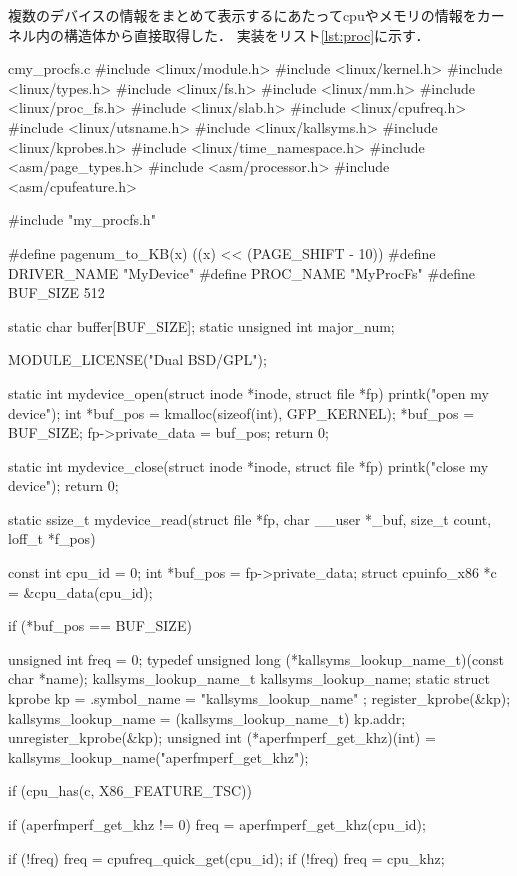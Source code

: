複数のデバイスの情報をまとめて表示するにあたってcpuやメモリの情報をカーネル内の構造体から直接取得した．
実装をリスト\ref{lst:proc}に示す．
\begin{longlisting}
\begin{myminted}{c}{my\_procfs.c}
#include <linux/module.h>
#include <linux/kernel.h>
#include <linux/types.h>
#include <linux/fs.h>
#include <linux/mm.h>
#include <linux/proc_fs.h>
#include <linux/slab.h>
#include <linux/cpufreq.h>
#include <linux/utsname.h>
#include <linux/kallsyms.h>
#include <linux/kprobes.h>
#include <linux/time_namespace.h>
#include <asm/page_types.h>
#include <asm/processor.h>
#include <asm/cpufeature.h>

#include "my_procfs.h"

#define pagenum_to_KB(x) ((x) << (PAGE_SHIFT - 10))
#define DRIVER_NAME "MyDevice"
#define PROC_NAME "MyProcFs"
#define BUF_SIZE 512

static char buffer[BUF_SIZE];
static unsigned int major_num;

MODULE_LICENSE("Dual BSD/GPL");


static int mydevice_open(struct inode *inode, struct file *fp) {
    printk("open my device\n");
    int *buf_pos = kmalloc(sizeof(int), GFP_KERNEL);
    *buf_pos = BUF_SIZE;
    fp->private_data = buf_pos;
    return 0;
}

static int mydevice_close(struct inode *inode, struct file *fp) {
    printk("close my device\n");
    return 0;
}

static ssize_t mydevice_read(struct file *fp, char __user *_buf, size_t count, loff_t *f_pos) {
    const int cpu_id = 0;
    int *buf_pos = fp->private_data;
    struct cpuinfo_x86 *c = &cpu_data(cpu_id);

    if (*buf_pos == BUF_SIZE) {
        unsigned int freq = 0;
        typedef unsigned long (*kallsyms_lookup_name_t)(const char *name);
        kallsyms_lookup_name_t kallsyms_lookup_name;
        static struct kprobe kp = {
           .symbol_name = "kallsyms_lookup_name"
        };
        register_kprobe(&kp);
        kallsyms_lookup_name = (kallsyms_lookup_name_t) kp.addr;
        unregister_kprobe(&kp);
        unsigned int (*aperfmperf_get_khz)(int) = kallsyms_lookup_name("aperfmperf_get_khz");
     
        if (cpu_has(c, X86_FEATURE_TSC)) {
            if (aperfmperf_get_khz != 0) freq = aperfmperf_get_khz(cpu_id);

            if (!freq) freq = cpufreq_quick_get(cpu_id);
            if (!freq) freq = cpu_khz;
        }

}}
\end{myminted}
\end{longlisting}
